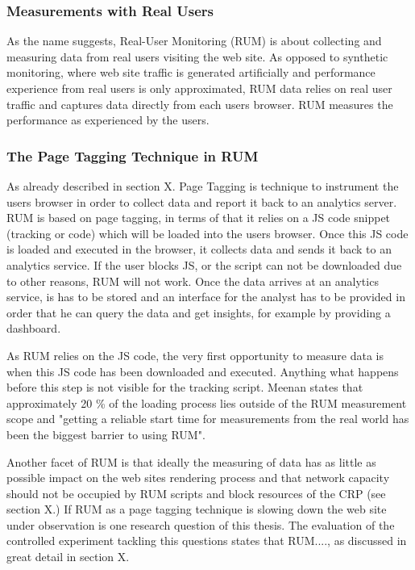 \subsubsection{Measurements with Real Users}

As the name suggests, Real-User Monitoring (RUM) is about collecting and measuring data from real users visiting the web site.
As opposed to synthetic monitoring, where web site traffic is generated artificially and performance experience from real users is only approximated, RUM data relies on real user traffic and captures data directly from each users browser. 
RUM measures the performance as experienced by the users. %




\subsubsection{The Page Tagging Technique in RUM}


As already described in section X. Page Tagging is technique to instrument the users browser in order to collect data and report it back to an analytics server.
RUM is based on page tagging, in terms of that it relies on a JS code snippet (tracking or code) which will be loaded into the users browser.
Once this JS code is loaded and executed in the browser, it collects data and sends it back to an analytics service.
If the user blocks JS, or the script can not be downloaded due to other reasons,  RUM will not work.
Once the data arrives at an analytics service, is has to be stored and an interface for the analyst has to be provided in order that he can query the data and get insights, for example by providing a dashboard. %

As RUM relies on the JS code, the very first opportunity to measure data is when this JS code has been downloaded and executed.
Anything what happens before this step is not visible for the tracking script.
Meenan states that approximately 20 \% of the loading process lies outside of the RUM measurement scope and "getting a reliable start time for measurements from the real world has been the biggest barrier to using RUM".%

Another facet of RUM is that ideally the measuring of data has as little as possible impact on the web sites rendering process and that network capacity should not be occupied by RUM scripts and block resources of the CRP (see section X.) %
If RUM as a page tagging technique is slowing down the web site under observation is one research question of this thesis.
The evaluation of the controlled experiment tackling this questions states that RUM...., as discussed in great detail in section X. %


